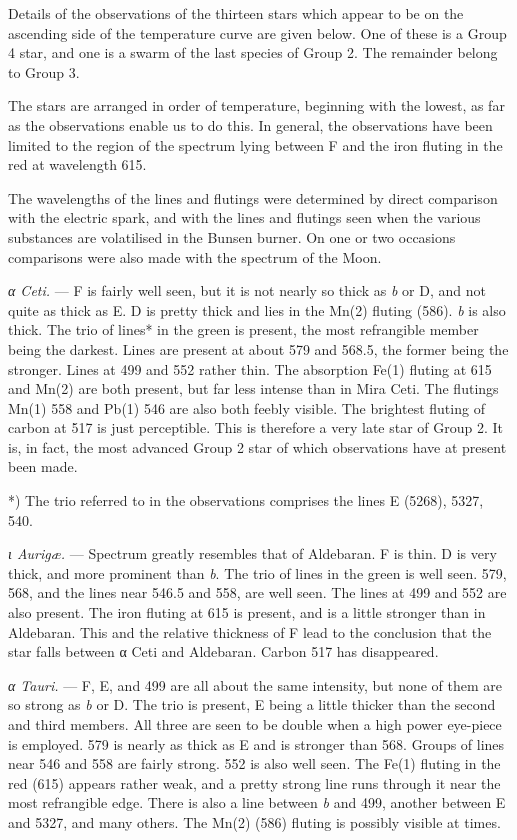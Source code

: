 \documentclass[a4paper, 12pt, oneside, polutonikogreek, english]{article}
\begin{document}
Details of the observations of the thirteen stars which appear to be on the ascending side of the temperature curve are given below. One of these is a Group 4 star, and one is a swarm of the last species of Group 2. The remainder belong to Group 3.

The stars are arranged in order of temperature, beginning with the lowest, as far as the observations enable us to do this. In general, the observations have been limited to the region of the spectrum lying between F and the iron fluting in the red at wavelength 615.

The wavelengths of the lines and flutings were determined by direct comparison with the electric spark, and with the lines and flutings seen when the various substances are volatilised in the Bunsen burner. On one or two occasions comparisons were also made with the spectrum of the Moon.

\emph{α Ceti.} --- F is fairly well seen, but it is not nearly so thick as \emph{b} or D, and not quite as thick as E. D is pretty thick and lies in the Mn(2) fluting (586). \emph{b} is also thick. The trio of lines* in the green is present, the most refrangible member being the darkest. Lines are present at about 579 and 568.5, the former being the stronger. Lines at 499 and 552 rather thin. The absorption Fe(1) fluting at 615 and Mn(2) are both present, but far less intense than in Mira Ceti. The flutings Mn(1) 558 and Pb(1) 546 are also both feebly visible. The brightest fluting of carbon at 517 is just perceptible. This is therefore a very late star of Group 2. It is, in fact, the most advanced Group 2 star of which observations have at present been made.

*) The trio referred to in the observations comprises the lines E (5268), 5327, 540.

\emph{ι Aurigæ.} --- Spectrum greatly resembles that of Aldebaran. F is thin. D is very thick, and more prominent than \emph{b}. The trio of lines in the green is well seen. 579, 568, and the lines near 546.5 and 558, are well seen. The lines at 499 and 552 are also present. The iron fluting at 615 is present, and is a little stronger than in Aldebaran. This and the relative thickness of F lead to the conclusion that the star falls between α Ceti and Aldebaran. Carbon 517 has disappeared.

\emph{α Tauri.} --- F, E, and 499 are all about the same intensity, but none of them are so strong as \emph{b} or D. The trio is present, E being a little thicker than the second and third members. All three are seen to be double when a high power eye-piece is employed. 579 is nearly as thick as E and is stronger than 568. Groups of lines near 546 and 558 are fairly strong. 552 is also well seen. The Fe(1) fluting in the red (615) appears rather weak, and a pretty strong line runs through it near the most refrangible edge. There is also a line between \emph{b} and 499, another between E and 5327, and many others. The Mn(2) (586) fluting is possibly visible at times.
\end{document}
